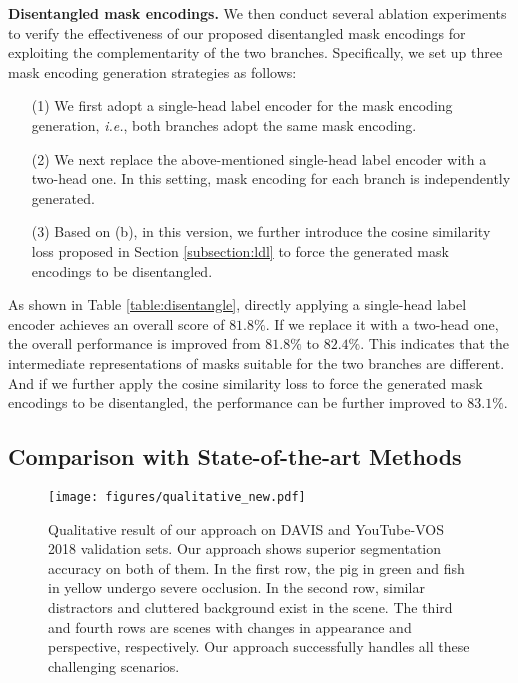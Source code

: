 \documentclass[10pt,twocolumn,letterpaper]{article}
\begin{document}
\noindent\textbf{Disentangled mask encodings.}
We then conduct several ablation experiments to verify the effectiveness of our proposed disentangled mask encodings for exploiting the complementarity of the two branches. Specifically, we set up three mask encoding generation strategies as follows:
\begin{enumerate}[itemsep= 0 pt,topsep = -1 pt, parsep=0 pt]
	\item[(1)] We first adopt a single-head label encoder for the mask encoding generation, \textit{i.e.}, both branches adopt the same mask encoding.
\item[(2)] We next replace the above-mentioned single-head label encoder with a two-head one. In this setting, mask encoding for each branch is independently generated.
	\item[(3)] Based on (b), in this version, we further introduce the cosine similarity loss proposed in Section \ref{subsection:ldl} to force the generated mask encodings to be disentangled.
\end{enumerate}
As shown in Table \ref{table:disentangle}, directly applying a single-head label encoder achieves an overall score of $81.8\%$. If we replace it with a two-head one, the overall performance is improved from $81.8\%$ to $82.4\%$. This indicates that the intermediate representations of masks suitable for the two branches are different. And if we further apply the cosine similarity loss to force the generated mask encodings to be disentangled, the performance can be further improved to $83.1\%$.


\subsection{Comparison with State-of-the-art Methods}

\begin{figure*}[htbp]
	\begin{center}
\texttt{[image: figures/qualitative\_new.pdf]}
	\vspace{-2.0em}
	\end{center}
	\caption{Qualitative result of our approach on DAVIS \cite{DAVIS2017} and YouTube-VOS 2018 \cite{Xu2018YouTubeVOSAL} validation sets.
	Our approach shows superior segmentation accuracy on both of them. In the first row, the pig in green and fish in yellow undergo severe occlusion. In the second row, similar distractors and cluttered background exist in the scene. The third and fourth rows are scenes with changes in appearance and perspective, respectively. Our approach successfully handles all these challenging scenarios.}
	\label{fig:qualitative}
	\vspace{-1.0em}
\end{figure*}
\end{document}
